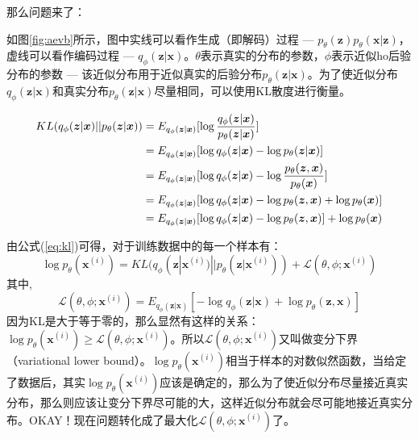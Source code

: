 那么问题来了：

如图\ref{fig:aevb}所示，图中实线可以看作生成（即解码）过程 --- $p_{\theta}(\boldsymbol{z})p_{\theta}(\boldsymbol{x}|\boldsymbol{z})$，虚线可以看作编码过程 --- $q_{\phi}(\boldsymbol{z}|\boldsymbol{x})$。$\theta$表示真实的分布的参数，$\phi$表示近似ho后验分布的参数 --- 该近似分布用于近似真实的后验分布$p_{\theta}(\boldsymbol{z}|\boldsymbol{x})$。为了使近似分布$q_{\phi}(\boldsymbol{z}|\boldsymbol{x})$和真实分布$p_{\theta}(\boldsymbol{z}|\boldsymbol{x})$尽量相同，可以使用KL散度进行衡量。

\begin{equatiopn}%
	\begin{align}
		KL(q_{\phi}(\boldsymbol{z}|\boldsymbol{x})||p_{\theta}(\boldsymbol{z}|\boldsymbol{x})) &= E_{q_{\phi}(\boldsymbol{z}|\boldsymbol{x})}[ \log \frac{q_{\phi}(\boldsymbol{z}|\boldsymbol{x})}{p_{\theta}(\boldsymbol{z}|\boldsymbol{x})} ] \notag \\
		&= E_{q_{\phi}(\boldsymbol{z}|\boldsymbol{x})}[ \log q_{\phi}(\boldsymbol{z}|\boldsymbol{x}) - \log {p_{\theta}(\boldsymbol{z}|\boldsymbol{x})} ] \notag \\
		&= E_{q_{\phi}(\boldsymbol{z}|\boldsymbol{x})}[ \log q_{\phi}(\boldsymbol{z}|\boldsymbol{x}) - \log \frac{p_{\theta}(\boldsymbol{z},\boldsymbol{x})} {p_{\theta}(\boldsymbol{x})} ] \notag \\
		&= E_{q_{\phi}(\boldsymbol{z}|\boldsymbol{x})}[ \log q_{\phi}(\boldsymbol{z}|\boldsymbol{x}) - \log p_{\theta}(\boldsymbol{z},\boldsymbol{x}) + \log p_{\theta}(\boldsymbol{x}) ] \notag \\
		&= E_{q_{\phi}(\boldsymbol{z}|\boldsymbol{x})}[ \log q_{\phi}(\boldsymbol{z}|\boldsymbol{x}) - \log p_{\theta}(\boldsymbol{z},\boldsymbol{x})] + \log p_{\theta}(\boldsymbol{x})   \label{eq:kl}
	\end{align}
\end{equatiopn}
由公式(\ref{eq:kl})可得，对于训练数据中的每一个样本有：
$$
\log p_{\theta}(\boldsymbol{x}^{(i)}) = KL(q_{\phi}(\boldsymbol{z}|\boldsymbol{x}^{(i)})||p_{\theta}(\boldsymbol{z}|\boldsymbol{x}^{(i)})) + \mathcal{L}(\theta, \phi; \boldsymbol{x}^{(i)})
$$
其中,
$$\mathcal{L}(\theta, \phi; \boldsymbol{x}^{(i)}) = E_{q_{\phi}(\boldsymbol{z}|\boldsymbol{x})}[ -\log q_{\phi}(\boldsymbol{z}|\boldsymbol{x}) + \log p_{\theta}(\boldsymbol{z},\boldsymbol{x})]
$$
因为KL是大于等于零的，那么显然有这样的关系：$\log p_{\theta}(\boldsymbol{x}^{(i)}) \ge \mathcal{L}(\theta, \phi; \boldsymbol{x}^{(i)})$。所以$\mathcal{L}(\theta, \phi; \boldsymbol{x}^{(i)})$又叫做变分下界（variational lower bound）。$\log p_{\theta}(\boldsymbol{x}^{(i)})$相当于样本的对数似然函数，当给定了数据后，其实$\log p_{\theta}(\boldsymbol{x}^{(i)})$应该是确定的，那么为了使近似分布尽量接近真实分布，那么则应该让变分下界尽可能的大，这样近似分布就会尽可能地接近真实分布。OKAY！现在问题转化成了最大化$\mathcal{L}(\theta, \phi; \boldsymbol{x}^{(i)})$了。

